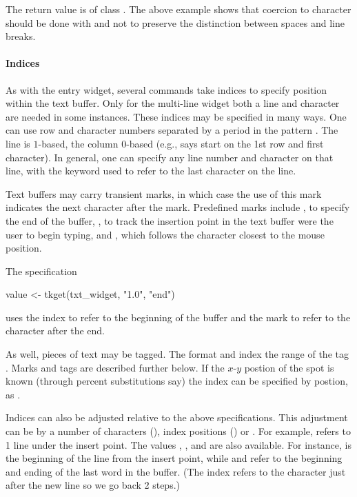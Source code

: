 The return value is of class .  The above example shows
that coercion to character
should be done with  and not
 to preserve the distinction between spaces and
line breaks.


\paragraph{Indices}
As with the entry widget, several commands take indices to specify
position within the text buffer. Only for the multi-line widget both a
line and character are needed in some instances. These indices may be
specified in many ways. One can use row and character numbers
separated by a period in the pattern . The line is
$1$-based, the column $0$-based (e.g.,  says start on the
1st row and first character). In general, one can specify any line number and character on
that line, with the keyword  used to refer to the last
character on the line.

Text buffers may carry transient marks, in which case the use of this
mark indicates the next character after the mark. Predefined marks
include , to specify the end of the buffer, ,
to track the insertion point in the text buffer were the user to begin
typing, and , which follows the character closest to the
mouse position.

The specification
\begin{Schunk}
\begin{Sinput}
 value <- tkget(txt_widget, "1.0", "end")
\end{Sinput}
\end{Schunk}
uses the index  to refer to the beginning of the buffer and
the mark  to refer to the character after the end.

As well, pieces of text may be tagged. The format  and
 index the range of the tag . Marks and tags
are described further below. If the $x$-$y$ postion of the spot is known
(through percent substitutions say) the index can be specified by
postion, as .

Indices can also be adjusted relative to the above
specifications. This adjustment can be by a number of characters
(), index positions () or . For
example,  refers to 1 line under the insert
point. The values , , 
and  are also available. For instance,  is the beginning of the line from the insert point, while
 and  refer to the
beginning and ending of the last word in the buffer. (The 
index refers to the character just after the new line so we go back 2
steps.)


